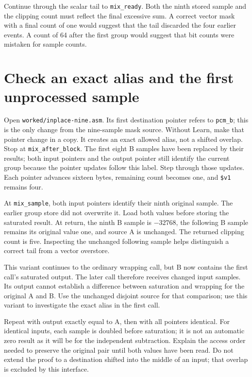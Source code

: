 

Continue through the scalar tail to \texttt{mix\_ready}. Both the ninth stored
sample and the clipping count must reflect the final excessive sum. A correct
vector mask with a final count of one would suggest that the tail discarded the
four earlier events. A count of 64 after the first group would suggest that bit
counts were mistaken for sample counts.

\section{Check an exact alias and the first unprocessed sample}

Open \texttt{worked/inplace-nine.asm}. Its first destination pointer refers to
\texttt{pcm\_b}; this is the only change from the nine-sample mask source.
Without Learn, make that pointer change in a copy. It creates an exact allowed
alias, not a shifted overlap.
Stop at \texttt{mix\_after\_block}. The first eight B samples have been replaced
by their results; both input pointers and the output pointer still identify the
current group because the pointer updates follow this label. Step through those
updates. Each pointer advances sixteen bytes, remaining count becomes one, and
\texttt{\$v1} remains four.

At \texttt{mix\_sample}, both input pointers identify their ninth original
sample. The earlier group store did not overwrite it. Load both values before
storing the saturated result. At return, the ninth B sample is $-32768$, the
following B sample remains its original value one, and source A is unchanged.
The returned clipping count is five. Inspecting the unchanged following sample
helps distinguish a correct tail from a vector overstore.

This variant continues to the ordinary wrapping call, but B now contains the
first call's saturated output. The later call therefore receives changed input
samples. Its output cannot establish a difference between saturation and
wrapping for the original A and B. Use the unchanged disjoint source for that
comparison; use this variant to investigate the exact alias in the first call.



Repeat with output exactly equal to A, then with all pointers identical. For
identical inputs, each sample is doubled before saturation; it is not an automatic
zero result as it will be for the independent subtraction. Explain the access
order needed to preserve the original pair until both values have been read.
Do not extend the proof to a destination shifted into the middle of an input;
that overlap is excluded by this interface.

